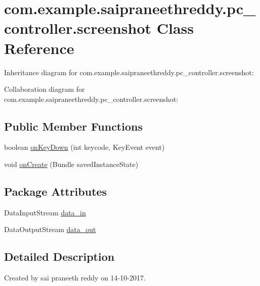 \hypertarget{classcom_1_1example_1_1saipraneethreddy_1_1pc__controller_1_1screenshot}{}\section{com.\+example.\+saipraneethreddy.\+pc\+\_\+controller.\+screenshot Class Reference}
\label{classcom_1_1example_1_1saipraneethreddy_1_1pc__controller_1_1screenshot}


Inheritance diagram for com.\+example.\+saipraneethreddy.\+pc\+\_\+controller.\+screenshot\+:


Collaboration diagram for com.\+example.\+saipraneethreddy.\+pc\+\_\+controller.\+screenshot\+:
\subsection*{Public Member Functions}
\begin{DoxyCompactItemize}
\item 
boolean \hyperlink{classcom_1_1example_1_1saipraneethreddy_1_1pc__controller_1_1screenshot_ab0cc1f59e60c5b37a4a13f5cff38834f}{on\+Key\+Down} (int keycode, Key\+Event event)
\item 
void \hyperlink{classcom_1_1example_1_1saipraneethreddy_1_1pc__controller_1_1screenshot_ad066052d07256bcb9931b80e938c94bb}{on\+Create} (Bundle saved\+Instance\+State)
\end{DoxyCompactItemize}
\subsection*{Package Attributes}
\begin{DoxyCompactItemize}
\item 
Data\+Input\+Stream \hyperlink{classcom_1_1example_1_1saipraneethreddy_1_1pc__controller_1_1screenshot_aa1a782d7935ea21272ea212aad1949b7}{data\+\_\+in}
\item 
Data\+Output\+Stream \hyperlink{classcom_1_1example_1_1saipraneethreddy_1_1pc__controller_1_1screenshot_aabc5b106112eddb9f6a01d828957fa77}{data\+\_\+out}
\end{DoxyCompactItemize}


\subsection{Detailed Description}
Created by sai praneeth reddy on 14-\/10-\/2017. 

